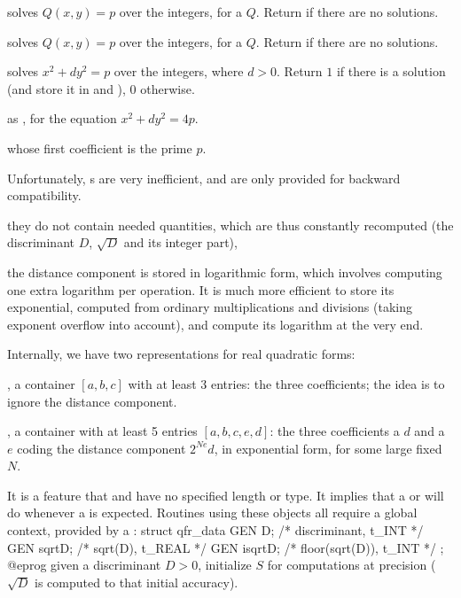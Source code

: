  solves $Q(x,y) = p$ over the integers, for
a  $Q$. Return  if there are no solutions.

 solves $Q(x,y) = p$ over the integers, for
a  $Q$. Return  if there are no solutions.

 solves
$x^2+ dy^2 = p$ over the integers, where $d > 0$. Return $1$ if there is a
solution (and store it in  and ), $0$ otherwise.

 as ,
for the equation $x^2 + dy^2 = 4p$.


  whose first coefficient
is the prime $p$.


 Unfortunately, s
are very inefficient, and are only provided for backward compatibility.

\item they do not contain needed quantities, which are thus constantly
recomputed (the discriminant $D$, $\sqrt{D}$ and its integer part),

\item the distance component is stored in logarithmic form, which involves
computing one extra logarithm per operation. It is much more efficient
to store its exponential, computed from ordinary multiplications and
divisions (taking exponent overflow into account), and compute its logarithm
at the very end.

Internally, we have two representations for real quadratic forms:

\item {}, a container $[a,b,c]$ with at least 3 entries: the three
coefficients; the idea is to ignore the distance component.

\item {}, a container with at least 5 entries $[a,b,c,e,d]$: the
three coefficients a  $d$ and a  $e$ coding the distance
component $2^{Ne} d$, in exponential form, for some large fixed $N$.

It is a feature that  and  have no specified length or
type. It implies that a  or  will do whenever a 
is expected. Routines using these objects all require a global context,
provided by a :
\bprog
  struct qfr_data {
    GEN D;        /* discriminant, t_INT   */
    GEN sqrtD;    /* sqrt(D), t_REAL       */
    GEN isqrtD;   /* floor(sqrt(D)), t_INT */
  };
@eprog
given a discriminant $D > 0$, initialize $S$ for computations at precision
 ($\sqrt{D}$ is computed to that initial accuracy).

